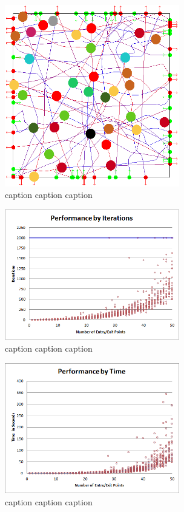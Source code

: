 \begin{figure}[H]
 \centering
 \includegraphics[width=3in]{images/res-40-entry-exit.png}
 \caption{caption caption caption}
\end{figure}



\begin{figure}[H]
 \centering
 \includegraphics[width=3in]{images/res-iter-graph.png}
 \caption{caption caption caption}
\end{figure}

\begin{figure}[H]
 \centering
 \includegraphics[width=3in]{images/res-time-graph.png}
 \caption{caption caption caption}
\end{figure}

